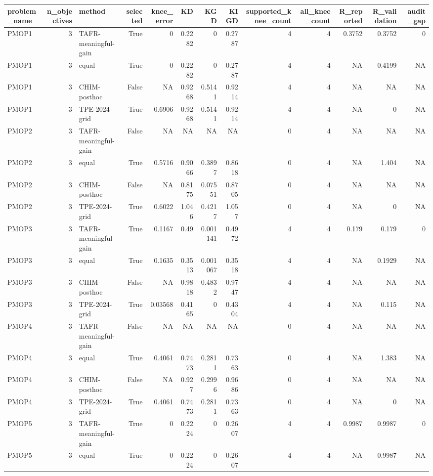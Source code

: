 \begin{tabular}{lrlrrrrrrrrrr}
\toprule
problem\_name & n\_objectives & method & selected & knee\_error & KD & KGD & KIGD & supported\_knee\_count & all\_knee\_count & R\_reported & R\_validation & audit\_gap \\
\midrule
PMOP1 & 3 & TAFR-meaningful-gain & True & 0 & 0.2282 & 0 & 0.2787 & 4 & 4 & 0.3752 & 0.3752 & 0 \\
PMOP1 & 3 & equal & True & 0 & 0.2282 & 0 & 0.2787 & 4 & 4 & NA & 0.4199 & NA \\
PMOP1 & 3 & CHIM-posthoc & False & NA & 0.9268 & 0.5141 & 0.9214 & 4 & 4 & NA & NA & NA \\
PMOP1 & 3 & TPE-2024-grid & True & 0.6906 & 0.9268 & 0.5141 & 0.9214 & 4 & 4 & NA & 0 & NA \\
PMOP2 & 3 & TAFR-meaningful-gain & False & NA & NA & NA & NA & 0 & 4 & NA & NA & NA \\
PMOP2 & 3 & equal & True & 0.5716 & 0.9066 & 0.3897 & 0.8618 & 0 & 4 & NA & 1.404 & NA \\
PMOP2 & 3 & CHIM-posthoc & False & NA & 0.8175 & 0.07551 & 0.8705 & 0 & 4 & NA & NA & NA \\
PMOP2 & 3 & TPE-2024-grid & True & 0.6022 & 1.046 & 0.4217 & 1.057 & 0 & 4 & NA & 0 & NA \\
PMOP3 & 3 & TAFR-meaningful-gain & True & 0.1167 & 0.49 & 0.001141 & 0.4972 & 4 & 4 & 0.179 & 0.179 & 0 \\
PMOP3 & 3 & equal & True & 0.1635 & 0.3513 & 0.001067 & 0.3518 & 4 & 4 & NA & 0.1929 & NA \\
PMOP3 & 3 & CHIM-posthoc & False & NA & 0.9818 & 0.4832 & 0.9747 & 4 & 4 & NA & NA & NA \\
PMOP3 & 3 & TPE-2024-grid & True & 0.03568 & 0.4165 & 0 & 0.4304 & 4 & 4 & NA & 0.115 & NA \\
PMOP4 & 3 & TAFR-meaningful-gain & False & NA & NA & NA & NA & 0 & 4 & NA & NA & NA \\
PMOP4 & 3 & equal & True & 0.4061 & 0.7473 & 0.2811 & 0.7363 & 0 & 4 & NA & 1.383 & NA \\
PMOP4 & 3 & CHIM-posthoc & False & NA & 0.927 & 0.2996 & 0.9686 & 0 & 4 & NA & NA & NA \\
PMOP4 & 3 & TPE-2024-grid & True & 0.4061 & 0.7473 & 0.2811 & 0.7363 & 0 & 4 & NA & 0 & NA \\
PMOP5 & 3 & TAFR-meaningful-gain & True & 0 & 0.2224 & 0 & 0.2607 & 4 & 4 & 0.9987 & 0.9987 & 0 \\
PMOP5 & 3 & equal & True & 0 & 0.2224 & 0 & 0.2607 & 4 & 4 & NA & 0.9987 & NA \\

\end{tabular}
